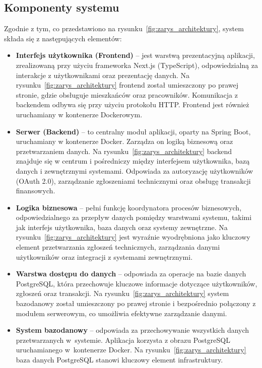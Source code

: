 \subsection{Komponenty systemu}
Zgodnie z tym, co przedstawiono na rysunku~\ref{fig:zarys_architektury}, system składa się z następujących elementów: 
\begin{itemize}

    \item \textbf{Interfejs użytkownika (Frontend)} -- jest warstwą prezentacyjną aplikacji, zrealizowaną przy użyciu frameworka Next.js (TypeScript), odpowiedzialną za interakcje z użytkownikami oraz prezentację danych. Na rysunku~\ref{fig:zarys_architektury} frontend został umieszczony po prawej stronie, gdzie obsługuje mieszkańców oraz pracowników. Komunikacja z backendem odbywa się przy użyciu protokołu HTTP. Frontend jest również uruchamiany w kontenerze Dockerowym.

    \item \textbf{Serwer (Backend)} -- to centralny moduł aplikacji, oparty na Spring Boot, uruchamiany w kontenerze Docker. Zarządza on logiką biznesową oraz przetwarzaniem danych. Na rysunku~\ref{fig:zarys_architektury} backend znajduje się w centrum i pośredniczy między interfejsem użytkownika, bazą danych i zewnętrznymi systemami. Odpowiada za autoryzację użytkowników (OAuth 2.0), zarządzanie zgłoszeniami technicznymi oraz obsługę transakcji finansowych. 

    \item \textbf{Logika biznesowa} -- pełni funkcję koordynatora procesów biznesowych, odpowiedzialnego za przepływ danych pomiędzy warstwami systemu, takimi jak interfejs użytkownika, baza danych oraz systemy zewnętrzne. Na rysunku~\ref{fig:zarys_architektury} jest wyraźnie wyodrębniona jako kluczowy element przetwarzania zgłoszeń technicznych, zarządzania danymi użytkowników oraz integracji z systemami zewnętrznymi.

    \item \textbf{Warstwa dostępu do danych} -- odpowiada za operacje na bazie danych PostgreSQL, która przechowuje kluczowe informacje dotyczące użytkowników, zgłoszeń oraz transakcji. Na rysunku~\ref{fig:zarys_architektury} system bazodanowy został umieszczony po prawej stronie i bezpośrednio połączony z modułem serwerowym, co umożliwia efektywne zarządzanie danymi.

    \item \textbf{System bazodanowy} --  odpowiada za przechowywanie wszystkich danych przetwarzanych w~systemie. Aplikacja korzysta z obrazu PostgreSQL uruchamianego w~kontenerze Docker. Na rysunku~\ref{fig:zarys_architektury} baza danych PostgreSQL stanowi kluczowy element infrastruktury. 


\end{itemize}
